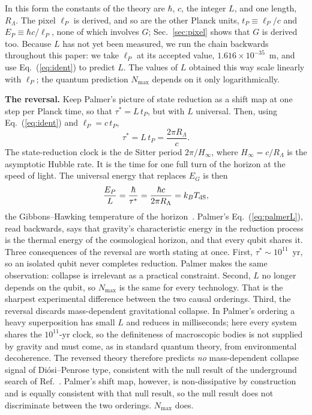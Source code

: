 \documentclass[aps,prd,twocolumn,superscriptaddress,nofootinbib,showkeys]{revtex4-2}
\begin{document}
In this form the constants of the theory are $\hbar$, $c$, the integer $L$, and one length, $R_\Lambda$. The pixel $\ell_P$ is derived, and so are the other Planck units, $t_P \equiv \ell_P/c$ and $E_P \equiv \hbar c/\ell_P$, none of which involves $G$; Sec.~\ref{sec:pixel} shows that $G$ is derived too. Because $L$ has not yet been measured, we run the chain backwards throughout this paper: we take $\ell_P$ at its accepted value, $1.616\times10^{-35}$~m, and use Eq.~(\ref{eq:ident}) to predict $L$. The values of $L$ obtained this way scale linearly with $\ell_P$; the quantum prediction $N_{\max}$ depends on it only logarithmically.

\textbf{The reversal.} Keep Palmer's picture of state reduction as a shift map at one step per Planck time, so that $\tau^* = L\,t_P$, but with $L$ universal. Then, using Eq.~(\ref{eq:ident}) and $\ell_P = c\,t_P$,
\begin{equation}
\tau^* = L\,t_P = \frac{2\pi R_\Lambda}{c} .
\label{eq:clock}
\end{equation}
The state-reduction clock is the de Sitter period $2\pi/H_\infty$, where $H_\infty = c/R_\Lambda$ is the asymptotic Hubble rate. It is the time for one full turn of the horizon at the speed of light. The universal energy that replaces $E_G$ is then
\begin{equation}
\frac{E_P}{L} = \frac{\hbar}{\tau^*} = \frac{\hbar c}{2\pi R_\Lambda} = k_B T_{\rm dS},
\label{eq:energy}
\end{equation}
the Gibbons--Hawking temperature of the horizon~\cite{gibbons1977}. Palmer's Eq.~(\ref{eq:palmerL}), read backwards, says that gravity's characteristic energy in the reduction process is the thermal energy of the cosmological horizon, and that every qubit shares it. Three consequences of the reversal are worth stating at once. First, $\tau^*\sim10^{11}$~yr, so an isolated qubit never completes reduction. Palmer makes the same observation: collapse is irrelevant as a practical constraint. Second, $L$ no longer depends on the qubit, so $N_{\max}$ is the same for every technology. That is the sharpest experimental difference between the two causal orderings. Third, the reversal discards mass-dependent gravitational collapse. In Palmer's ordering a heavy superposition has small $L$ and reduces in milliseconds; here every system shares the $10^{11}$-yr clock, so the definiteness of macroscopic bodies is not supplied by gravity and must come, as in standard quantum theory, from environmental decoherence. The reversed theory therefore predicts \emph{no} mass-dependent collapse signal of Di\'osi--Penrose type, consistent with the null result of the underground search of Ref.~\cite{donadi2021}. Palmer's shift map, however, is non-dissipative by construction and is equally consistent with that null result, so the null result does not discriminate between the two orderings. $N_{\max}$ does.
\end{document}
